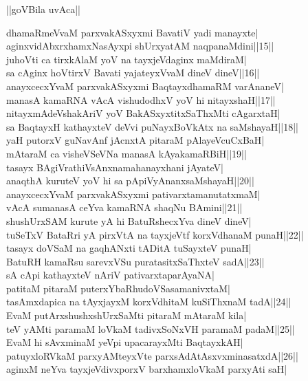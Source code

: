 \documentclass{article}
\begin{document}
\begin{center}
||goVBila uvAca||
\end{center}

dhamaRmeVvaM parxvakASxyxmi BavatiV yadi manayxte|\\
aginxvidAbxrxhamxNasAyxpi shUrxyatAM naqpanaMdini||15||\\
juhoVti ca tirxkAlaM yoV na tayxjeVdaginx maMdiraM|\\
sa cAginx hoVtirxV Bavati yajateyxVvaM dineV dineV||16||\\
anayxcecxYvaM parxvakASxyxmi BaqtayxdhamaRM varAnaneV|\\
manasA kamaRNA vAcA vishudodhxV yoV hi nitayxshaH||17||\\
nitayxmAdeVshakAriV yoV BakASxyxtitxSaThxMti cAgarxtaH|\\
sa BaqtayxH kathayxteV deVvi puNayxBoVkAtx na saMshayaH||18||\\
yaH putorxV guNavAnf jAcnxtA pitaraM pAlayeVcuCxBaH|\\
mAtaraM ca visheVSeVNa manasA kAyakamaRBiH||19||\\
tasayx BAgiVrathiVsAnxnamahanayxhani jAyateV|\\
anaqthA kuruteV yoV hi sa pApiVyAnanxsaMshayaH||20||\\
anayxcecxYvaM parxvakASxyxmi pativarxtamanutatxmaM|\\
vAcA sumanasA ceYva kamaRNA shaqNu BAmini||21||\\
shushUrxSAM kurute yA hi BatuRshecxYva dineV dineV|\\
tuSeTxV BataRri yA pirxVtA na tayxjeVtf korxVdhanaM punaH||22||\\
tasayx doVSaM na gaqhANxti tADitA tuSayxteV punaH|\\
BatuRH kamaRsu sarevxVSu puratasitxSaThxteV sadA||23||\\
sA cApi kathayxteV nAriV pativarxtaparAyaNA|\\
patitaM pitaraM puterxYbaRhudoVSasamanivxtaM|\\
tasAmxdapica na tAyxjayxM korxVdhitaM kuSiThxnaM tadA||24||\\
EvaM putArxshushxshUrxSaMti pitaraM mAtaraM kila|\\
teV yAMti paramaM loVkaM tadivxSoNxVH paramaM padaM||25||\\
EvaM hi sAvxminaM yeVpi upacarayxMti BaqtayxkAH|\\
patuyxloRVkaM parxyAMteyxVte parxsAdAtAsxvxminasatxdA||26||\\
aginxM neYva tayxjeVdivxporxV barxhamxloVkaM parxyAti saH|\\
\end{document}
